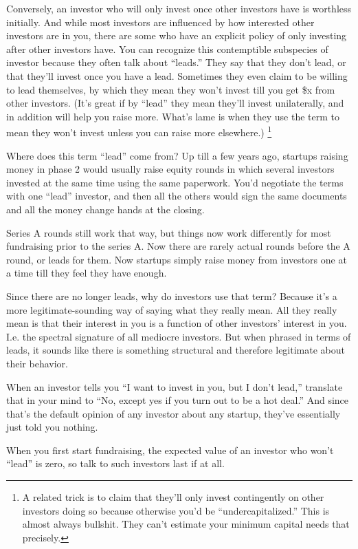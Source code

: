 \documentclass[12pt]{book}
\begin{document}
Conversely, an investor who will only invest once other investors have
is worthless initially. And while most investors are influenced by how
interested other investors are in you, there are some who have an
explicit policy of only investing after other investors have. You can
recognize this contemptible subspecies of investor because they often
talk about ``leads.'' They say that they don't lead, or that they'll
invest once you have a lead. Sometimes they even claim to be willing to
lead themselves, by which they mean they won't invest till you get \$x
from other investors. (It's great if by ``lead'' they mean they'll
invest unilaterally, and in addition will help you raise more. What's
lame is when they use the term to mean they won't invest unless you can
raise more elsewhere.) \footnote{A related trick is to claim that they'll only invest
contingently on other investors doing so because otherwise you'd be
``undercapitalized.'' This is almost always bullshit. They can't
estimate your minimum capital needs that precisely.}

Where does this term ``lead'' come from? Up till a few years ago,
startups raising money in phase 2 would usually raise equity rounds in
which several investors invested at the same time using the same
paperwork. You'd negotiate the terms with one ``lead'' investor, and
then all the others would sign the same documents and all the money
change hands at the closing.

Series A rounds still work that way, but things now work differently for
most fundraising prior to the series A. Now there are rarely actual
rounds before the A round, or leads for them. Now startups simply raise
money from investors one at a time till they feel they have enough.

Since there are no longer leads, why do investors use that term? Because
it's a more legitimate-sounding way of saying what they really mean. All
they really mean is that their interest in you is a function of other
investors' interest in you. I.e. the spectral signature of all mediocre
investors. But when phrased in terms of leads, it sounds like there is
something structural and therefore legitimate about their behavior.

When an investor tells you ``I want to invest in you, but I don't
lead,'' translate that in your mind to ``No, except yes if you turn out
to be a hot deal.'' And since that's the default opinion of any investor
about any startup, they've essentially just told you nothing.

When you first start fundraising, the expected value of an investor who
won't ``lead'' is zero, so talk to such investors last if at all.
\end{document}
